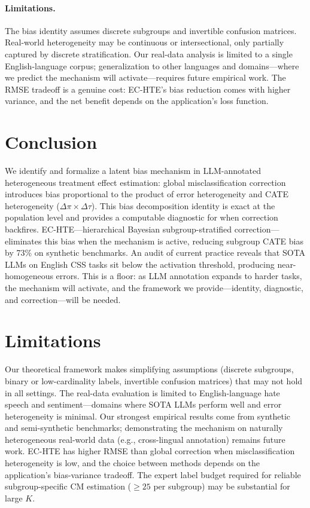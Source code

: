 \documentclass[11pt,a4paper]{article}
\begin{document}
\paragraph{Limitations.}
The bias identity assumes discrete subgroups and invertible confusion matrices.
Real-world heterogeneity may be continuous or intersectional, only partially captured by discrete stratification.
Our real-data analysis is limited to a single English-language corpus; generalization to other languages and domains---where we predict the mechanism will activate---requires future empirical work.
The RMSE tradeoff is a genuine cost: EC-HTE's bias reduction comes with higher variance, and the net benefit depends on the application's loss function.

\section{Conclusion}

We identify and formalize a latent bias mechanism in LLM-annotated heterogeneous treatment effect estimation: global misclassification correction introduces bias proportional to the product of error heterogeneity and CATE heterogeneity ($\Delta\pi \times \Delta\tau$).
This bias decomposition identity is exact at the population level and provides a computable diagnostic for when correction backfires.
EC-HTE---hierarchical Bayesian subgroup-stratified correction---eliminates this bias when the mechanism is active, reducing subgroup CATE bias by 73\% on synthetic benchmarks.
An audit of current practice reveals that SOTA LLMs on English CSS tasks sit below the activation threshold, producing near-homogeneous errors.
This is a floor: as LLM annotation expands to harder tasks, the mechanism will activate, and the framework we provide---identity, diagnostic, and correction---will be needed.


\section*{Limitations}

Our theoretical framework makes simplifying assumptions (discrete subgroups, binary or low-cardinality labels, invertible confusion matrices) that may not hold in all settings.
The real-data evaluation is limited to English-language hate speech and sentiment---domains where SOTA LLMs perform well and error heterogeneity is minimal.
Our strongest empirical results come from synthetic and semi-synthetic benchmarks; demonstrating the mechanism on naturally heterogeneous real-world data (e.g., cross-lingual annotation) remains future work.
EC-HTE has higher RMSE than global correction when misclassification heterogeneity is low, and the choice between methods depends on the application's bias-variance tradeoff.
The expert label budget required for reliable subgroup-specific CM estimation ($\geq 25$ per subgroup) may be substantial for large $K$.
\end{document}
